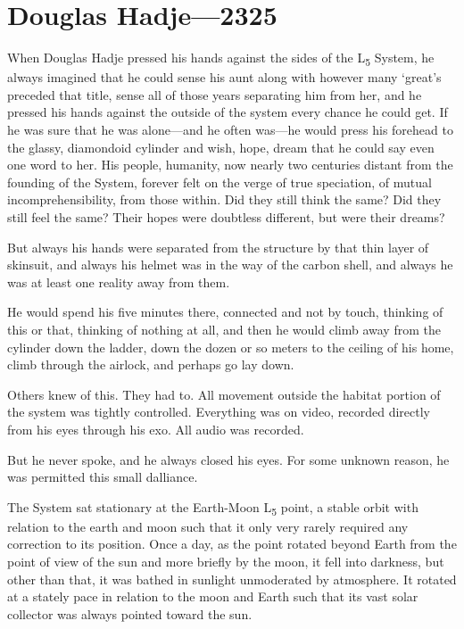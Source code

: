 \hypertarget{douglas-hadje-2325}{%
\chapter{Douglas Hadje—2325}\label{douglas-hadje-2325}}

When Douglas Hadje pressed his hands against the sides of the L\textsubscript{5} System, he always imagined that he could sense his aunt along with however many `great's preceded that title, sense all of those years separating him from her, and he pressed his hands against the outside of the system every chance he could get. If he was sure that he was alone---and he often was---he would press his forehead to the glassy, diamondoid cylinder and wish, hope, dream that he could say even one word to her. His people, humanity, now nearly two centuries distant from the founding of the System, forever felt on the verge of true speciation, of mutual incomprehensibility, from those within. Did they still think the same? Did they still feel the same? Their hopes were doubtless different, but were their dreams?

But always his hands were separated from the structure by that thin layer of skinsuit, and always his helmet was in the way of the carbon shell, and always he was at least one reality away from them.

He would spend his five minutes there, connected and not by touch, thinking of this or that, thinking of nothing at all, and then he would climb away from the cylinder down the ladder, down the dozen or so meters to the ceiling of his home, climb through the airlock, and perhaps go lay down.

Others knew of this. They had to. All movement outside the habitat portion of the system was tightly controlled. Everything was on video, recorded directly from his eyes through his exo. All audio was recorded.

But he never spoke, and he always closed his eyes. For some unknown reason, he was permitted this small dalliance.

The System sat stationary at the Earth-Moon L\textsubscript{5} point, a stable orbit with relation to the earth and moon such that it only very rarely required any correction to its position. Once a day, as the point rotated beyond Earth from the point of view of the sun and more briefly by the moon, it fell into darkness, but other than that, it was bathed in sunlight unmoderated by atmosphere. It rotated at a stately pace in relation to the moon and Earth such that its vast solar collector was always pointed toward the sun.

